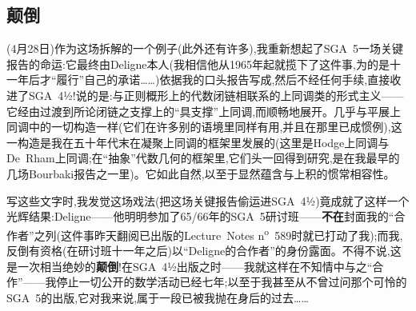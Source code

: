 \subsection{颠倒}


(4月28日)作为这场拆解的一个例子(此外还有许多),我重新想起了SGA~5一场关键报告的命运:它最终由Deligne本人(我相信他从1965年起就揽下了这件事,为的是十一年后才“履行”自己的承诺……)依据我的口头报告写成,然后不经任何手续,直接收进了SGA~4½!说的是:与正则概形上的代数闭链相联系的上同调类的形式主义——它经由过渡到所论闭链之支撑上的“具支撑”上同调,而顺畅地展开。几乎与平展上同调中的一切构造一样(它们在许多别的语境里同样有用,并且在那里已成惯例),这一构造是我在五十年代末在凝聚上同调的框架里发展的(这里是Hodge上同调与De~Rham上同调;在“抽象”代数几何的框架里,它们头一回得到研究,是在我最早的几场Bourbaki报告之一里)。它如此\dmark{}自然,以至于显然蕴含与上积的惯常相容性。

写这些文字时,我发觉这场戏法(把这场关键报告偷运进SGA~4½)竟成就了这样一个光辉结果:Deligne——他明明参加了65/66年的SGA~5研讨班——\textbf{不在}封面我的“合作者”之列(这件事昨天翻阅已出版的Lecture~Notes n\textsuperscript{o}~589时就已打动了我);而我,反倒有资格(在研讨班十一年之后)以“Deligne的合作者”的身份露面。不得不说,这是一次相当绝妙的\textbf{颠倒}!在SGA~4½出版之时——我就这样在不知情中与之“合作”——我停止一切公开的数学活动已经七年;以至于我甚至从不曾过问那个可怜的SGA~5的出版,它对我来说,属于一段已被我抛在身后的过去……

